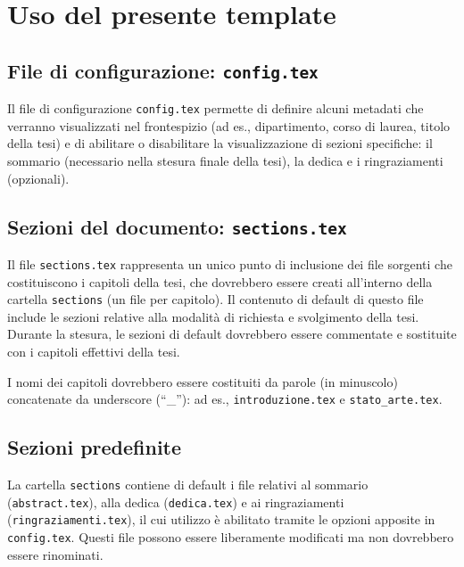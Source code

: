 \clearpage{\pagestyle{empty}\cleardoublepage}
\chapter{Uso del presente template}
\label{chap:uso_template}

\section{File di configurazione: \texttt{config.tex}}

Il file di configurazione \texttt{config.tex} permette di definire alcuni metadati che verranno visualizzati nel frontespizio (ad es., dipartimento, corso di laurea, titolo della tesi) e di abilitare o disabilitare la visualizzazione di sezioni specifiche: il sommario (necessario nella stesura finale della tesi), la dedica e i ringraziamenti (opzionali).

\section{Sezioni del documento: \texttt{sections.tex}}

Il file \texttt{sections.tex} rappresenta un unico punto di inclusione dei file sorgenti che costituiscono i capitoli della tesi, che dovrebbero essere creati all'interno della cartella \texttt{sections} (un file per capitolo). Il contenuto di default di questo file include le sezioni relative alla modalità di richiesta e svolgimento della tesi. Durante la stesura, le sezioni di default dovrebbero essere commentate e sostituite con i capitoli effettivi della tesi.

I nomi dei capitoli dovrebbero essere costituiti da parole (in minuscolo) concatenate da underscore (``\_''): ad es., \texttt{introduzione.tex} e \texttt{stato\_arte.tex}.

\section{Sezioni predefinite}

La cartella \texttt{sections} contiene di default i file relativi al sommario (\texttt{abstract.tex}), alla dedica (\texttt{dedica.tex}) e ai ringraziamenti (\texttt{ringraziamenti.tex}), il cui utilizzo è abilitato tramite le opzioni apposite in \texttt{config.tex}. Questi file possono essere liberamente modificati ma non dovrebbero essere rinominati.